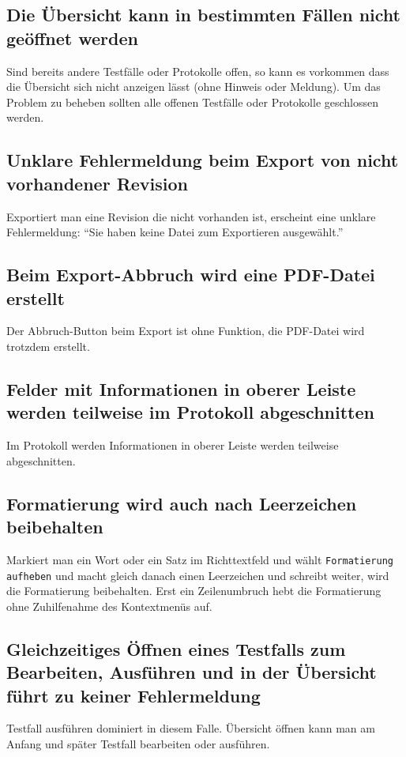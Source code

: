\documentclass[11pt,a4paper,titlepage]{article}
\begin{document}
\subsection*{Die Übersicht kann in bestimmten Fällen nicht geöffnet werden}
Sind bereits andere Testfälle oder Protokolle offen, so kann es vorkommen dass die Übersicht sich nicht anzeigen lässt (ohne Hinweis oder Meldung).
Um das Problem zu beheben sollten alle offenen Testfälle oder Protokolle geschlossen werden.

\subsection*{Unklare Fehlermeldung beim Export von nicht vorhandener Revision}
Exportiert man eine Revision die nicht vorhanden ist, erscheint eine unklare Fehlermeldung: "`Sie haben keine Datei zum Exportieren ausgewählt."'

\subsection*{Beim Export-Abbruch wird eine PDF-Datei erstellt}
Der Abbruch-Button beim Export ist ohne Funktion, die PDF-Datei wird trotzdem erstellt.

\subsection*{Felder mit Informationen in oberer Leiste werden teilweise im Protokoll abgeschnitten}
Im Protokoll werden Informationen in oberer Leiste werden teilweise abgeschnitten.

\subsection*{Formatierung wird auch nach Leerzeichen beibehalten}
Markiert man ein Wort oder ein Satz im Richttextfeld und wählt \texttt{Formatierung aufheben} und macht gleich danach einen Leerzeichen und schreibt weiter, wird die Formatierung beibehalten.
Erst ein Zeilenumbruch hebt die Formatierung ohne Zuhilfenahme des Kontextmenüs auf.

\subsection*{Gleichzeitiges Öffnen eines Testfalls zum Bearbeiten, Ausführen und in der Übersicht führt zu keiner Fehlermeldung}
Testfall ausführen dominiert in diesem Falle. Übersicht öffnen kann man am Anfang und später Testfall bearbeiten oder ausführen.
\end{document}
